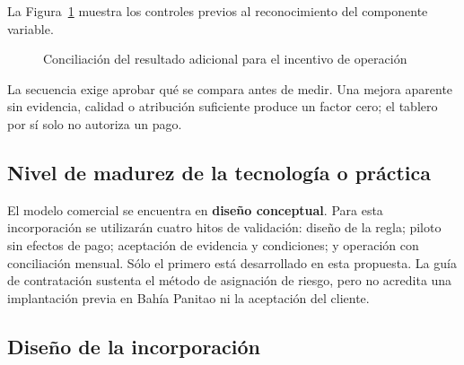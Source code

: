 La Figura~\ref{fig:inn4-conciliacion} muestra los controles previos al reconocimiento del componente variable.

\begin{figure}[H]
  \centering
  \caption{Conciliación del resultado adicional para el incentivo de operación}
  \label{fig:inn4-conciliacion}
\end{figure}

La secuencia exige aprobar qué se compara antes de medir. Una mejora aparente sin evidencia, calidad o atribución suficiente produce un factor cero; el tablero por sí solo no autoriza un pago.

\subsection{Nivel de madurez de la tecnología o práctica}

El modelo comercial se encuentra en \textbf{diseño conceptual}. Para esta incorporación se utilizarán cuatro hitos de validación: diseño de la regla; piloto sin efectos de pago; aceptación de evidencia y condiciones; y operación con conciliación mensual. Sólo el primero está desarrollado en esta propuesta. La guía de contratación sustenta el método de asignación de riesgo, pero no acredita una implantación previa en Bahía Panitao ni la aceptación del cliente.

\subsection{Diseño de la incorporación}

